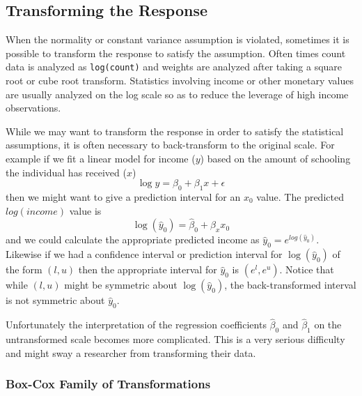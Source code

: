 \documentclass[]{book}
\theoremstyle{definition}
\theoremstyle{definition}
\theoremstyle{remark}
\begin{document}
\subsection{Transforming the Response}\label{transforming-the-response}

When the normality or constant variance assumption is violated,
sometimes it is possible to transform the response to satisfy the
assumption. Often times count data is analyzed as \texttt{log(count)}
and weights are analyzed after taking a square root or cube root
transform. Statistics involving income or other monetary values are
usually analyzed on the log scale so as to reduce the leverage of high
income observations.

While we may want to transform the response in order to satisfy the
statistical assumptions, it is often necessary to back-transform to the
original scale. For example if we fit a linear model for income (\(y\))
based on the amount of schooling the individual has received (\(x\))
\[\log y=\beta_{0}+\beta_{1}x+\epsilon\] then we might want to give a
prediction interval for an \(x_{0}\) value. The predicted
\(log(income)\) value is
\[\log\left(\hat{y}_{0}\right)=\hat{\beta}_{0}+\hat{\beta}_{x}x_{0}\]
and we could calculate the appropriate predicted income as
\(\hat{y}_{0}=e^{log\left(\hat{y}_{0}\right)}\). Likewise if we had a
confidence interval or prediction interval for
\(\log\left(\hat{y}_{0}\right)\) of the form \(\left(l,u\right)\) then
the appropriate interval for \(\hat{y}_{0}\) is
\(\left(e^{l},e^{u}\right)\). Notice that while \(\left(l,u\right)\)
might be symmetric about \(\log\left(\hat{y}_{0}\right)\), the
back-transformed interval is not symmetric about \(\hat{y}_{0}\).

Unfortunately the interpretation of the regression coefficients
\(\hat{\beta}_{0}\) and \(\hat{\beta}_{1}\) on the untransformed scale
becomes more complicated. This is a very serious difficulty and might
sway a researcher from transforming their data.

\subsubsection{Box-Cox Family of
Transformations}\label{box-cox-family-of-transformations}
\end{document}
